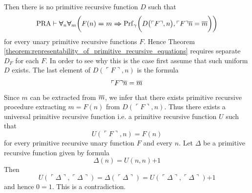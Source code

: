 \documentclass[10pt]{amsart}
\newcommand{\godel}[1]{\ulcorner #1 \urcorner}
\newcommand{\mforall}{\boldsymbol{\forall}}
\newcommand{\mra}{\boldsymbol{\Rightarrow}}
\newcommand{\meq}{\boldsymbol{=}}
\newcommand{\mplus}{\boldsymbol{+}}
\begin{document}
\begin{remark}\label{remark:representability_cannot_be_made_uniform_on_primitive_recursive_function}
	Then there is no primitive recursive function $D$ such that
  $$\mathrm{PRA} \vdash \mforall_n\mforall_m\bigg(F(n) \meq m \mra \mathrm{Prf}_{\gamma}\bigg(D\big(\godel{F},n\big), \godel{F}\ol{n} = \ol{m}\bigg)\bigg)$$
	for every unary primitive recursive functions $F$. Hence Theorem \ref{theorem:representability_of_primitive_recursive_equations} requires separate $D_F$ for each $F$. In order to see why this is the case first assume that such uniform $D$ exists. The last element of $D\left(\godel{F},n\right)$ is the formula
	$$\godel{F}\ol{n} = \ol{m}$$
	Since $m$ can be extracted from $\overline{m}$, we infer that there exists primitive recursive procedure extracting $m \meq F(n)$ from $D\left(\godel{F},n\right)$. Thus there exists a universal primitive recursive function i.e. a primitive recursive function $U$ such that
	$$U(\godel{F},n) \meq F(n)$$
	for every primitive recursive unary function $F$ and every $n$. Let $\Delta$ be a primitive recursive function given by formula
	$$\Delta(n) \meq U(n,n) \mplus 1$$
	Then
	$$U(\godel{\Delta},\godel{\Delta}) \meq \Delta(\godel{\Delta}) \meq U(\godel{\Delta},\godel{\Delta}) \mplus 1$$
	and hence $0 \meq 1$. This is a contradiction.
\end{remark}
\end{document}
